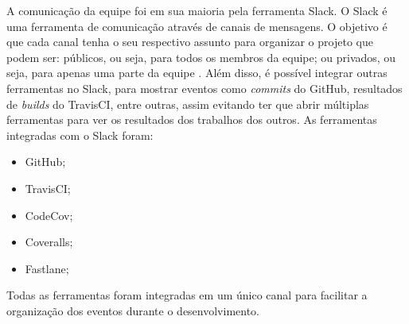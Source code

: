 A comunicação da equipe foi em sua maioria pela ferramenta Slack. O Slack é uma ferramenta de comunicação através de canais de mensagens. O objetivo é que cada canal tenha o seu respectivo assunto para organizar o projeto que podem ser: públicos, ou seja, para todos os membros da equipe; ou privados, ou seja, para apenas uma parte da equipe \cite{slack}. Além disso, é possível integrar outras ferramentas no Slack, para mostrar eventos como \textit{commits} do GitHub, resultados de \textit{builds} do TravisCI, entre outras, assim evitando ter que abrir múltiplas ferramentas para ver os resultados dos trabalhos dos outros. As ferramentas integradas com o Slack foram:

\begin{itemize}
    \item GitHub;
    \item TravisCI;
    \item CodeCov;
    \item Coveralls;
    \item Fastlane;
\end{itemize}

Todas as ferramentas foram integradas em um único canal para facilitar a organização dos eventos durante o desenvolvimento.
